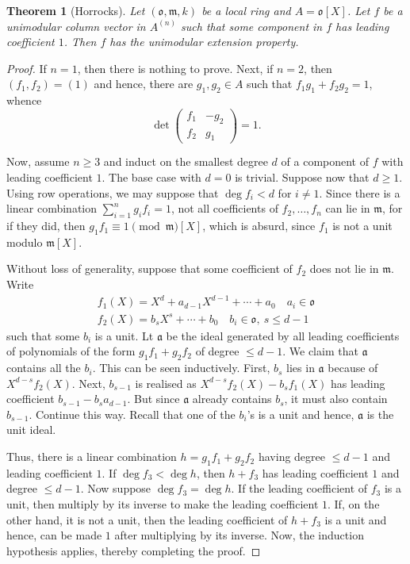 \documentclass[12pt]{article}
\theoremstyle{thmstyle}
\newtheorem{theorem}{Theorem}[section]
\theoremstyle{defstyle}
\newcommand{\fraka}{\mathfrak{a}} %
\newcommand{\frakm}{\mathfrak{m}} %
\renewcommand{\le}{\leqslant}
\renewcommand{\ge}{\geqslant}
\newcommand{\frako}{\mathfrak{o}}
\begin{document}
\begin{theorem}[Horrocks]
    Let $(\frako,\frakm, k)$ be a local ring and  $A = \frako[X]$. Let $f$ be a unimodular column vector in $A^{(n)}$ such that some component in $f$ has leading coefficient $1$. Then $f$ has the unimodular extension property.
\end{theorem}
\begin{proof}
    If $n = 1$, then there is nothing to prove. Next, if $n = 2$, then $(f_1, f_2) = (1)$ and hence, there are $g_1, g_2\in A$ such that $f_1g_1 + f_2g_2 = 1$, whence 
    \begin{equation*}
        \det
        \begin{pmatrix}
            f_1 & -g_2\\
            f_2 & g_1
        \end{pmatrix}
        = 1.
    \end{equation*}

    Now, assume $n\ge 3$ and induct on the smallest degree $d$ of a component of $f$ with leading coefficient $1$. The base case with $d = 0$ is trivial. Suppose now that $d\ge 1$. Using row operations, we may suppose that $\deg f_i < d$ for $i\ne 1$. Since there is a linear combination $\sum_{i = 1}^n g_if_i = 1$, not all coefficients of $f_2,\dots, f_n$ can lie in $\frakm$, for if they did, then $g_1f_1\equiv 1\pmod\frakm[X]$, which is absurd, since $f_1$ is not a unit modulo $\frakm[X]$.

    Without loss of generality, suppose that some coefficient of $f_2$ does not lie in $\frakm$. Write 
    \begin{align*}
        f_1(X) = X^{d} + a_{d - 1}X^{d - 1} + \cdots + a_0\quad a_i\in\frako\\
        f_2(X) = b_sX^{s} + \cdots + b_0\quad b_i\in\frako,~s\le d - 1
    \end{align*}
    such that some $b_i$ is a unit. Lt $\fraka$ be the ideal generated by all leading coefficients of polynomials of the form $g_1f_1 + g_2f_2$ of degree $\le d - 1$. We claim that $\fraka$ contains all the $b_i$. This can be seen inductively. First, $b_s$ lies in $\fraka$ because of $X^{d - s}f_2(X)$. Next, $b_{s - 1}$ is realised as $X^{d - s}f_2(X) - b_sf_1(X)$ has leading coefficient $b_{s - 1} - b_sa_{d - 1}$. But since $\fraka$ already contains $b_s$, it must also contain $b_{s - 1}$. Continue this way. Recall that one of the $b_i$'s is a unit and hence, $\fraka$ is the unit ideal.

    Thus, there is a linear combination $h = g_1f_1 + g_2f_2$ having degree $\le d - 1$ and leading coefficient $1$. If $\deg f_3 < \deg h$, then $h + f_3$ has leading coefficient $1$ and degree $\le d - 1$. Now suppose $\deg f_3 = \deg h$. If the leading coefficient of $f_3$ is a unit, then multiply by its inverse to make the leading coefficient $1$. If, on the other hand, it is not a unit, then the leading coefficient of $h + f_3$ is a unit and hence, can be made $1$ after multiplying by its inverse. Now, the induction hypothesis applies, thereby completing the proof.
\end{proof}
\end{document}
